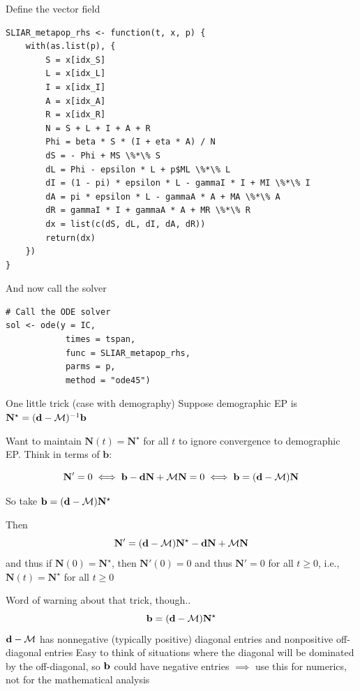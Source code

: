 \documentclass[aspectratio=43]{beamer}
\begin{document}
\begin{frame}[fragile]{Define the vector field}
\begin{lstlisting}[language=Renhanced]
SLIAR_metapop_rhs <- function(t, x, p) {
	with(as.list(p), {
		S = x[idx_S]
		L = x[idx_L]
		I = x[idx_I]
		A = x[idx_A]
		R = x[idx_R]
		N = S + L + I + A + R
		Phi = beta * S * (I + eta * A) / N
		dS = - Phi + MS \%*\% S
		dL = Phi - epsilon * L + p$ML \%*\% L
		dI = (1 - pi) * epsilon * L - gammaI * I + MI \%*\% I
		dA = pi * epsilon * L - gammaA * A + MA \%*\% A
		dR = gammaI * I + gammaA * A + MR \%*\% R
		dx = list(c(dS, dL, dI, dA, dR))
		return(dx)
	})
}	
\end{lstlisting}
\end{frame}
	

\begin{frame}[fragile]{And now call the solver}
\begin{lstlisting}
# Call the ODE solver
sol <- ode(y = IC, 
			times = tspan, 
			func = SLIAR_metapop_rhs, 
			parms = p,
			method = "ode45")
\end{lstlisting}	
\end{frame}
	
\begin{frame}[fragile]{One little trick (case with demography)}
	Suppose demographic EP is $\mathbf{N}^\star=(\mathbf{d}-\mathcal{M})^{-1}\mathbf{b}$

	Want to maintain $\mathbf{N}(t)=\mathbf{N}^\star$ for all $t$ to ignore convergence to demographic EP. Think in terms of $\mathbf{b}$:
	
	$$
	\mathbf{N}'=0\iff \mathbf{b}-\mathbf{d}\mathbf{N}+\mathcal{M}\mathbf{N}=0 \iff \mathbf{b} = (\mathbf{d}-\mathcal{M})\mathbf{N}
	$$
	
	So take $\mathbf{b}=(\mathbf{d}-\mathcal{M})\mathbf{N}^\star$
	
	Then
	$$
	\mathbf{N}' = (\mathbf{d}-\mathcal{M})\mathbf{N}^\star
	-\mathbf{d}\mathbf{N}+\mathcal{M}\mathbf{N}
	$$
	and thus if $\mathbf{N}(0)=\mathbf{N}^\star$, then $\mathbf{N}'(0)=0$ and thus $\mathbf{N}'=0$ for all $t\geq 0$, i.e., $\mathbf{N}(t)=\mathbf{N}^\star$ for all $t\geq 0$
\end{frame}

\begin{frame}{Word of warning about that trick, though..}
$$
\mathbf{b}=(\mathbf{d}-\mathcal{M})\mathbf{N}^\star
$$
\vfill
$\mathbf{d}-\mathcal{M}$ has nonnegative (typically positive) diagonal entries and nonpositive off-diagonal entries
\vfill
Easy to think of situations where the diagonal will be dominated by the off-diagonal, so $\mathbf{b}$ could have negative entries
\vfill
$\implies$ use this for numerics, not for the mathematical analysis
\end{frame}
\end{document}

